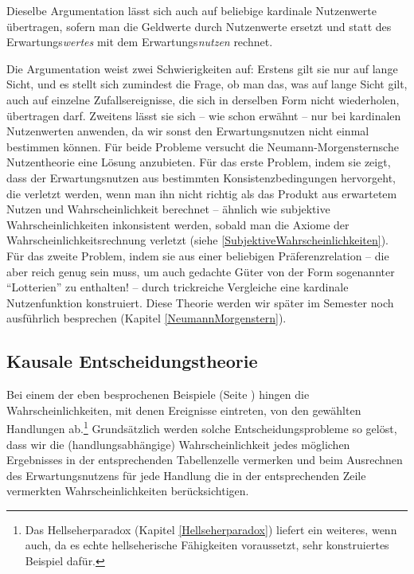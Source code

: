 Dieselbe Argumentation lässt sich auch auf beliebige kardinale Nutzenwerte
übertragen, sofern man die Geldwerte durch Nutzenwerte ersetzt und statt des
Erwartungs{\em wertes} mit dem Erwartungs{\em nutzen} rechnet.

Die Argumentation weist zwei Schwierigkeiten auf: 
Erstens gilt sie nur auf lange Sicht, und es stellt sich zumindest die Frage, ob
man das, was auf lange Sicht gilt, auch auf einzelne Zufallsereignisse, die sich
in derselben Form nicht wiederholen, übertragen darf. Zweitens lässt sie sich --
wie schon erwähnt -- nur bei kardinalen Nutzenwerten anwenden, da wir sonst den
Erwartungsnutzen nicht einmal bestimmen können. Für beide Probleme versucht die
Neumann-Morgensternsche Nutzentheorie eine Lösung anzubieten. Für das erste
Problem, indem sie zeigt, dass der Erwartungsnutzen aus bestimmten
Konsistenzbedingungen hervorgeht, die verletzt werden, wenn man ihn nicht richtig
als das Produkt aus erwartetem Nutzen und Wahrscheinlichkeit berechnet -- ähnlich
wie subjektive Wahrscheinlichkeiten inkonsistent werden, sobald man die Axiome
der Wahrscheinlichkeitsrechnung verletzt (siehe
\ref{SubjektiveWahrscheinlichkeiten}). Für das zweite Problem, indem sie aus
einer beliebigen Präferenzrelation -- die aber reich genug sein muss, um auch
gedachte Güter von der Form sogenannter "`Lotterien"' zu enthalten! -- durch
trickreiche Vergleiche eine kardinale Nutzenfunktion konstruiert. Diese Theorie
werden wir später im Semester noch ausführlich besprechen (Kapitel
\ref{NeumannMorgenstern}).

\subsection{Kausale Entscheidungstheorie}

Bei einem der eben besprochenen Beispiele (Seite
\pageref{BeispielKausaleEntscheidung}) hingen die Wahrscheinlichkeiten, mit denen
Ereignisse eintreten, von den gewählten Handlungen ab.\footnote{Das
Hellseherparadox (Kapitel \ref{Hellseherparadox}) liefert ein weiteres, wenn
auch, da es echte hellseherische Fähigkeiten voraussetzt, sehr konstruiertes
Beispiel dafür.} Grundsätzlich werden solche Entscheidungsprobleme so gelöst,
dass wir die (handlungsabhängige) Wahrscheinlichkeit jedes möglichen Ergebnisses
in der entsprechenden Tabellenzelle vermerken und beim Ausrechnen des
Erwartungsnutzens für jede Handlung die in der entsprechenden Zeile vermerkten
Wahrscheinlichkeiten berücksichtigen.

